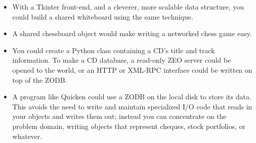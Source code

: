 \begin{itemize}
  \item With a Tkinter front-end, and a cleverer, more scalable data
  structure, you could build a shared whiteboard using the same
  technique.

  \item A shared chessboard object would make writing a networked chess
  game easy.  

  \item You could create a Python class containing a CD's title and
  track information.  To make a CD database, a read-only ZEO server
  could be opened to the world, or an HTTP or XML-RPC interface could
  be written on top of the ZODB.

  \item A program like Quicken could use a ZODB on the local disk to
  store its data.  This avoids the need to write and maintain
  specialized I/O code that reads in your objects and writes them out;
  instead you can concentrate on the problem domain, writing objects
  that represent cheques, stock portfolios, or whatever.

\end{itemize}

